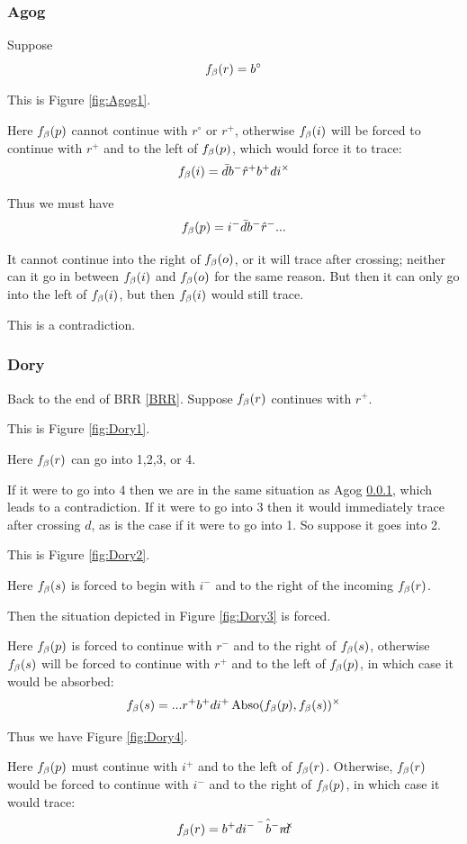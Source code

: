 \subsubsection{Agog}\label{Agog}
Suppose
\[
f_\beta(r) = b^\circ
\]

This is Figure \ref{fig:Agog1}.

Here $f_\beta(p)$ cannot continue with $r^\circ$ or $r^+$, otherwise $f_\beta(i)$ will be forced to continue with $r^+$ and to the left of $f_\beta(p)$, which would force it to trace:
\[
f_\beta(i) = \bar{d} b^- \hat{r}^+ b^+ d i^\times
\]

Thus we must have
\[
f_\beta(p) = i^- \bar{d} b^- \hat{r}^-...
\]

It cannot continue into the right of $f_\beta(o)$, or it will trace after crossing; neither can it go in between $f_\beta(i)$ and $f_\beta(o)$ for the same reason. But then it can only go into the left of $f_\beta(i)$, but then $f_\beta(i)$ would still trace.

This is a contradiction.

\subsubsection{Dory}\label{Dory}
Back to the end of BRR \ref{BRR}. Suppose $f_\beta(r)$ continues with $r^+$.

This is Figure \ref{fig:Dory1}.

Here $f_\beta(r)$ can go into 1,2,3, or 4.

If it were to go into 4 then we are in the same situation as Agog \ref{Agog}, which leads to a contradiction. If it were to go into 3 then it would immediately trace after crossing $d$, as is the case if it were to go into 1. So suppose it goes into 2.

This is Figure \ref{fig:Dory2}.

Here $f_\beta(s)$ is forced to begin with $i^-$ and to the right of the incoming $f_\beta(r)$.

Then the situation depicted in Figure \ref{fig:Dory3} is forced.

Here $f_\beta(p)$ is forced to continue with $r^-$ and to the right of $f_\beta(s)$, otherwise $f_\beta(s)$ will be forced to continue with $r^+$ and to the left of $f_\beta(p)$, in which case it would be absorbed:
\[
f_\beta(s) = ...r^+ b^+ d i^+ \operatorname{Abso}(f_\beta(p), f_\beta(s))^\times
\]

Thus we have Figure \ref{fig:Dory4}.

Here $f_\beta(p)$ must continue with $i^+$ and to the left of $f_\beta(r)$. Otherwise, $f_\beta(r)$ would be forced to continue with $i^-$ and to the right of $f_\beta(p)$, in which case it would trace:
\[
f_\beta(r) = b^+ d \hat{i^- \bar{d} b^- r^\times}
\]

